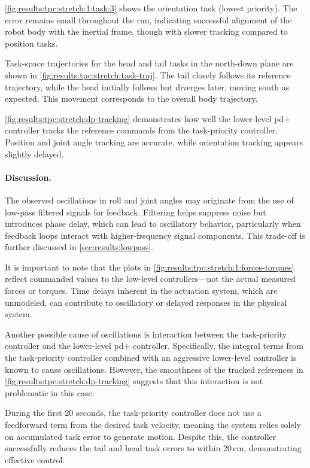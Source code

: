 \autoref{fig:results:tpc:stretch:1:task:3} shows the orientation task (lowest priority). The error remains small throughout the run, indicating successful alignment of the robot body with the inertial frame, though with slower tracking compared to position tasks.

Task-space trajectories for the head and tail tasks in the north-down plane are shown in \autoref{fig:results:tpc:stretch:task-traj}. The tail closely follows its reference trajectory, while the head initially follows but diverges later, moving south as expected. This movement corresponds to the overall body trajectory.

\autoref{fig:results:tpc:stretch:dp-tracking} demonstrates how well the lower-level \gls{pd+} controller tracks the reference commands from the task-priority controller. Position and joint angle tracking are accurate, while orientation tracking appears slightly delayed.

\paragraph{Discussion.}

The observed oscillations in roll and joint angles may originate from the use of low-pass filtered signals for feedback. Filtering helps suppress noise but introduces phase delay, which can lead to oscillatory behavior, particularly when feedback loops interact with higher-frequency signal components. This trade-off is further discussed in \autoref{sec:results:lowpass}.

It is important to note that the plots in \autoref{fig:results:tpc:stretch:1:forces-torques} reflect commanded values to the low-level controllers—not the actual measured forces or torques. Time delays inherent in the actuation system, which are unmodeled, can contribute to oscillatory or delayed responses in the physical system.

Another possible cause of oscillations is interaction between the task-priority controller and the lower-level \gls{pd+} controller. Specifically, the integral terms from the task-priority controller combined
with an aggressive lower-level controller is known to cause oscillations.
However, the smoothness of the tracked references in \autoref{fig:results:tpc:stretch:dp-tracking} suggests that this interaction is not problematic in this case.

During the first \(20\) seconds, the task-priority controller does not use a feedforward term from the desired task velocity, meaning the system relies solely on accumulated task error to generate motion. Despite this, the controller successfully reduces the tail and head task errors to within \(20\,\mathrm{cm}\), demonstrating effective control.


